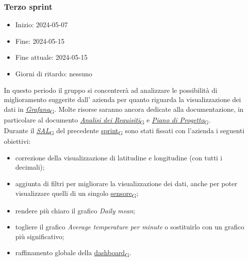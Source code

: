 \newpage
\subsubsection{Terzo sprint}
\begin{itemize}
	\item Inizio: 2024-05-07
	\item Fine: 2024-05-15
	\item Fine attuale: 2024-05-15
	\item Giorni di ritardo: nessuno
\end{itemize}

In questo periodo il gruppo si concentrerà ad analizzare le possibilità di miglioramento suggerite dall' azienda per quanto riguarda la visualizzazione dei dati in \href{https://7last.github.io/docs/rtb/documentazione-interna/glossario\#grafana}{\textit{Grafana}\textsubscript{G}}. Molte risorse saranno ancora dedicate alla documentazione, in particolare al documento \href{https://7last.github.io/docs/rtb/documentazione-interna/glossario\#analisi-dei-requisiti}{\textit{Analisi dei Requisiti}\textsubscript{G}} e \href{https://7last.github.io/docs/rtb/documentazione-interna/glossario\#piano-di-progetto}{\textit{Piano di Progetto}\textsubscript{G}}. \\
Durante il \href{https://7last.github.io/docs/rtb/documentazione-interna/glossario\#stato-avanzamento-lavori}{\textit{SAL}\textsubscript{G}} del precedente \href{https://7last.github.io/docs/rtb/documentazione-interna/glossario\#sprint}{sprint\textsubscript{G}} sono stati fissati con l'azienda i seguenti obiettivi:
\begin{itemize}
	\item correzione della visualizzazione di latitudine e longitudine (con tutti i decimali);
	\item aggiunta di filtri per migliorare la visualizzazione dei dati, anche per poter visualizzare quelli di un singolo \href{https://7last.github.io/docs/rtb/documentazione-interna/glossario\#sensore}{sensore\textsubscript{G}};
	\item rendere più chiaro il grafico \textit{Daily mean};
	\item togliere il grafico \textit{Average temperature per minute} o sostituirlo con un grafico più significativo;
	\item raffinamento globale della \href{https://7last.github.io/docs/rtb/documentazione-interna/glossario\#dashboard}{dashboard\textsubscript{G}}.
\end{itemize}

